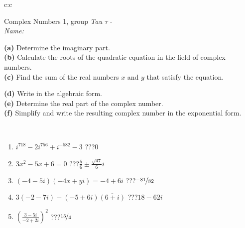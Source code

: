 \documentclass[10pt]{report}
\begin{document}
\begin{tabular}{c:c}
\begin{minipage}[c][104.5mm][t]{0.5\linewidth}
\begin{center}
\vspace{5mm}
{\huge Complex Numbers 1, group \textit{Tau $\tau$} -}\\[5mm]
\textit{Name:}\phantom{xxxxxxxxxxxxxxxxxxxxxxxxxxxxxxxxxxxxxxxxxxxxxxxxxxxxxxxxxxxxxxxxx}\\[5mm]
\begin{minipage}{0.95\linewidth}
\begin{center}
{\small \begin{minipage}{0.44\textwidth} \raggedright
\textbf{(a)} Determine the imaginary part. \\[1mm]
\textbf{(b)} Calculate the roots of the quadratic equation in the field of complex numbers. \\[1mm]
\textbf{(c)} Find the sum of the real numbers \(x\) and \(y\) that satisfy the equation. \end{minipage} \begin{minipage}{0.54\textwidth}
\textbf{(d)} Write in the algebraic form. \\[1mm]
\textbf{(e)} Determine the real part of the complex number. \\[1mm]
\textbf{(f)} Simplify and write the resulting complex number in the exponential form.
\end{minipage}
} \vspace{3mm}
\end{center}
\end{minipage}
\\[1mm]
\begin{minipage}{0.79\linewidth}
\begin{center}
\begin{varwidth}{\linewidth}
\setlength{\itemsep}{0pt}
\begin{enumerate}
\large
\item $i^{718}-2i^{756}+i^{-582}-3$\quad \dotfill\; ???\;\dotfill \quad $0$
\item $3x^2-5x+6=0$\quad \dotfill\; ???\;\dotfill \quad $\frac{5}{6} \pm{}\frac{ \sqrt{47}}{6}i$
\item $(-4-5i)(-4x+yi)=-4+6i$\quad \dotfill\; ???\;\dotfill \quad $\nicefrac{-81}{82}$
\item $3(-2-7i)-(-5+6i)\overline{(6+i)}$\quad \dotfill\; ???\;\dotfill \quad $18-62i$
\item $\left(\frac{3-5i}{-2+2i}\right)^2$\quad \dotfill\; ???\;\dotfill \quad $\nicefrac{15}{4}$

\end{enumerate}
\end{varwidth}
\end{center}
\end{minipage}
\end{center}
\end{minipage}
\end{tabular}
\end{document}
